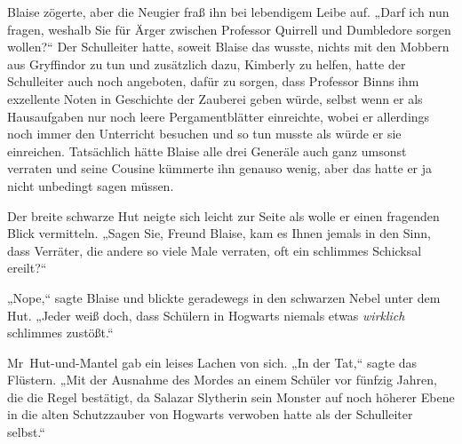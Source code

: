 Blaise zögerte, aber die Neugier fraß ihn bei lebendigem Leibe auf. „Darf ich nun fragen, weshalb Sie für Ärger zwischen Professor Quirrell und Dumbledore sorgen wollen?“ Der Schulleiter hatte, soweit Blaise das wusste, nichts mit den Mobbern aus Gryffindor zu tun und zusätzlich dazu, Kimberly zu helfen, hatte der Schulleiter auch noch angeboten, dafür zu sorgen, dass Professor Binns ihm exzellente Noten in Geschichte der Zauberei geben würde, selbst wenn er als Hausaufgaben nur noch leere Pergamentblätter einreichte, wobei er allerdings noch immer den Unterricht besuchen und so tun musste als würde er sie einreichen. Tatsächlich hätte Blaise alle drei Generäle auch ganz umsonst verraten und seine Cousine kümmerte ihn genauso wenig, aber das hatte er ja nicht unbedingt sagen müssen.

Der breite schwarze Hut neigte sich leicht zur Seite als wolle er einen fragenden Blick vermitteln. „Sagen Sie, Freund Blaise, kam es Ihnen jemals in den Sinn, dass Verräter, die andere so viele Male verraten, oft ein schlimmes Schicksal ereilt?“

„Nope,“ sagte Blaise und blickte geradewegs in den schwarzen Nebel unter dem Hut. „Jeder weiß doch, dass Schülern in Hogwarts niemals etwas \emph{wirklich} schlimmes zustößt.“

Mr~Hut-und-Mantel gab ein leises Lachen von sich. „In der Tat,“ sagte das Flüstern. „Mit der Ausnahme des Mordes an einem Schüler vor fünfzig Jahren, die die Regel bestätigt, da Salazar Slytherin sein Monster auf noch höherer Ebene in die alten Schutzzauber von Hogwarts verwoben hatte als der Schulleiter selbst.“

